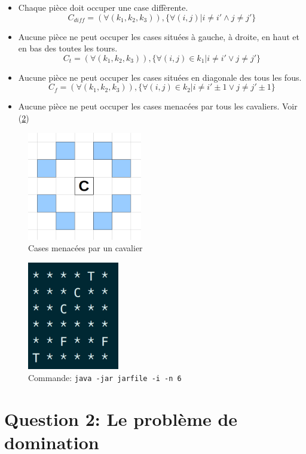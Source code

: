 \documentclass[letterpaper]{article}
\begin{document}
\begin{itemize}
\item Chaque pièce doit occuper une case diffèrente.
  $$ C_{diff} = ( \forall (k_1, k_2, k_3) ), \{ \forall (i,j) | i
  \neq i' \land j \neq j'\} $$
\item Aucune pièce ne peut occuper les cases situées à gauche, à
  droite, en haut et en bas des toutes les tours.
  $$ C_t = ( \forall (k_1, k_2, k_3) ), \{ \forall (i,j) \in k_1 | i
  \neq i' \lor j \neq j'\}$$
\item Aucune pièce ne peut occuper les cases situées en diagonale des
  tous les fous.
  $$ C_f = ( \forall (k_1, k_2, k_3) ), \{ \forall (i,j) \in k_2 | i
  \neq i' \pm 1 \lor j \neq j' \pm 1\}$$
\item Aucune pièce ne peut occuper les cases menacées par tous les
  cavaliers. Voir (\ref{fig:cavalier})
\end{itemize}

\begin{figure}[ht]
  \centering
  \label{fig:cavalier}
  \includegraphics[width=5cm]{fig/cavalier.png}
  \caption{Cases menacées par un cavalier}
\end{figure}

\begin{figure}[ht]
  \centering
  \label{fig:cavalier}
  \includegraphics[width=4cm]{fig/ss-independence.png}
  \caption{Commande: \texttt{java -jar jarfile -i -n 6}}
\end{figure}



\section{Question 2: Le problème de domination}
\end{document}
